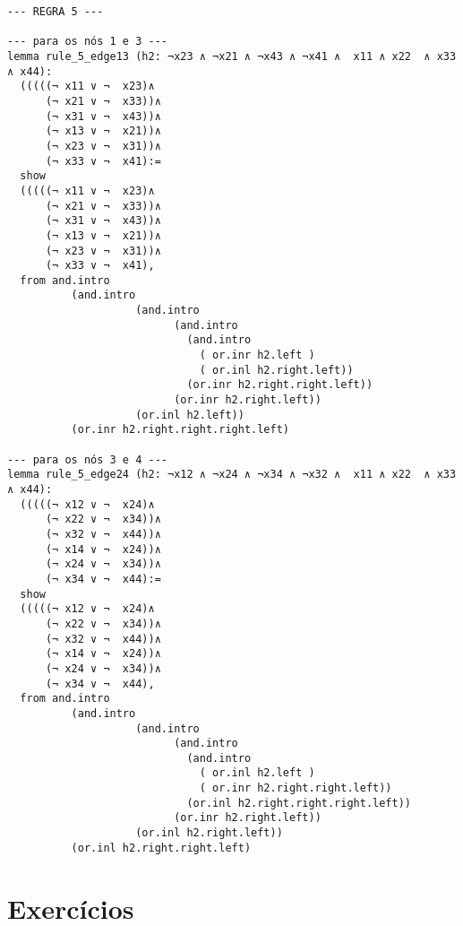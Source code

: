 \begin{lstlisting}
--- REGRA 5 ---

--- para os nós 1 e 3 ---
lemma rule_5_edge13 (h2: ¬x23 ∧ ¬x21 ∧ ¬x43 ∧ ¬x41 ∧  x11 ∧ x22  ∧ x33 ∧ x44):
  (((((¬ x11 ∨ ¬  x23)∧
      (¬ x21 ∨ ¬  x33))∧ 
      (¬ x31 ∨ ¬  x43))∧ 
      (¬ x13 ∨ ¬  x21))∧ 
      (¬ x23 ∨ ¬  x31))∧ 
      (¬ x33 ∨ ¬  x41):=
  show
  (((((¬ x11 ∨ ¬  x23)∧
      (¬ x21 ∨ ¬  x33))∧ 
      (¬ x31 ∨ ¬  x43))∧ 
      (¬ x13 ∨ ¬  x21))∧ 
      (¬ x23 ∨ ¬  x31))∧ 
      (¬ x33 ∨ ¬  x41),
  from and.intro
          (and.intro
                    (and.intro
                          (and.intro
                            (and.intro
                              ( or.inr h2.left ) 
                              ( or.inl h2.right.left))
                            (or.inr h2.right.right.left))
                          (or.inr h2.right.left))
                    (or.inl h2.left))
          (or.inr h2.right.right.right.left)

--- para os nós 3 e 4 ---
lemma rule_5_edge24 (h2: ¬x12 ∧ ¬x24 ∧ ¬x34 ∧ ¬x32 ∧  x11 ∧ x22  ∧ x33 ∧ x44):
  (((((¬ x12 ∨ ¬  x24)∧
      (¬ x22 ∨ ¬  x34))∧ 
      (¬ x32 ∨ ¬  x44))∧ 
      (¬ x14 ∨ ¬  x24))∧ 
      (¬ x24 ∨ ¬  x34))∧ 
      (¬ x34 ∨ ¬  x44):=
  show
  (((((¬ x12 ∨ ¬  x24)∧
      (¬ x22 ∨ ¬  x34))∧ 
      (¬ x32 ∨ ¬  x44))∧ 
      (¬ x14 ∨ ¬  x24))∧ 
      (¬ x24 ∨ ¬  x34))∧ 
      (¬ x34 ∨ ¬  x44),
  from and.intro
          (and.intro
                    (and.intro
                          (and.intro
                            (and.intro
                              ( or.inl h2.left ) 
                              ( or.inr h2.right.right.left))
                            (or.inl h2.right.right.right.left))
                          (or.inr h2.right.left))
                    (or.inl h2.right.left))
          (or.inl h2.right.right.left)
\end{lstlisting}

\section{Exercícios}

